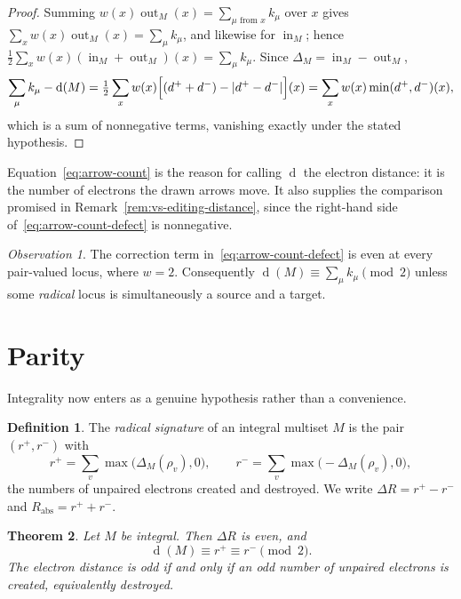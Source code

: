\documentclass[11pt]{article}
\numberwithin{equation}{section}
\newcommand{\gout}{\operatorname{out}}
\newcommand{\gin}{\operatorname{in}}
\newcommand{\del}{\operatorname{d}}
\theoremstyle{plain}
\newtheorem{theorem}{Theorem}[section]
\theoremstyle{definition}
\newtheorem{definition}[theorem]{Definition}
\theoremstyle{remark}
\newtheorem{observation}{Observation}
\begin{document}
\begin{proof}
Summing $w(x)\gout_M(x)=\sum_{\mu\text{ from }x}k_\mu$ over $x$ gives
$\sum_x w(x)\gout_M(x)=\sum_\mu k_\mu$, and likewise for $\gin_M$; hence
$\tfrac12\sum_x w(x)(\gin_M+\gout_M)(x)=\sum_\mu k_\mu$.  Since
$\Delta_M=\gin_M-\gout_M$,
\[
  \sum_\mu k_\mu-\del(M)
  =\tfrac12\sum_x w(x)\Bigl[(d^++d^-)-|d^+-d^-|\Bigr](x)
  =\sum_x w(x)\min(d^+,d^-)(x),
\]
which is a sum of nonnegative terms, vanishing exactly under the stated
hypothesis.
\end{proof}

Equation~\eqref{eq:arrow-count} is the reason for calling $\del$ the electron
distance: it is the number of electrons the drawn arrows move.  It also
supplies the comparison promised in Remark~\ref{rem:vs-editing-distance}, since
the right-hand side of~\eqref{eq:arrow-count-defect} is nonnegative.

\begin{observation}
\label{obs:cancellation-parity}
The correction term in~\eqref{eq:arrow-count-defect} is even at every
pair-valued locus, where $w=2$.  Consequently
$\del(M)\equiv\sum_\mu k_\mu\pmod 2$ unless some \emph{radical} locus is
simultaneously a source and a target.
\end{observation}

\section{Parity}
\label{sec:parity}

Integrality now enters as a genuine hypothesis rather than a convenience.

\begin{definition}
\label{def:signature}
The \emph{radical signature} of an integral multiset $M$ is the pair
$(r^+,r^-)$ with
\begin{equation}
  r^+=\sum_{v}\max\bigl(\Delta_M(\rho_v),0\bigr),\qquad
  r^-=\sum_{v}\max\bigl(-\Delta_M(\rho_v),0\bigr) ,
  \label{eq:signature}
\end{equation}
the numbers of unpaired electrons created and destroyed.  We write
$\Delta R=r^+-r^-$ and $R_{\mathrm{abs}}=r^++r^-$.
\end{definition}

\begin{theorem}
\label{thm:parity}
Let $M$ be integral.  Then $\Delta R$ is even, and
\begin{equation}
  \del(M)\equiv r^+\equiv r^-\pmod 2 .
  \label{eq:parity}
\end{equation}
The electron distance is odd if and only if an odd number of unpaired
electrons is created, equivalently destroyed.
\end{theorem}
\end{document}
